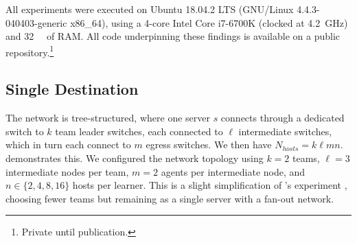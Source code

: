 \documentclass[10pt, times, comsoc]{IEEEtran}
\newcommand{\wvec}[1]{\ensuremath{\bm{w}_{#1}}}
\begin{document}
All experiments were executed on Ubuntu 18.04.2 LTS (GNU/Linux 4.4.3-040403-generic x86\_64), using a 4-core Intel Core i7-6700K (clocked at \SI{4.2}{\giga\hertz}) and \SI{32}{\gibi\byte} of RAM.
All code underpinning these findings is available on a public repository.\footnote{Private until publication.}

\subsection{Single Destination}\label{sec:single-dest}
The network is tree-structured, where one server $s$ connects through a dedicated switch to $k$ team leader switches, each connected to $\ell$ intermediate switches, which in turn each connect to $m$ egress switches.
We then have $N_{\mathit{hosts}} = k \ell m n$.
 demonstrates this.
We configured the network topology using $k=2$ teams, $\ell=3$ intermediate nodes per team, $m=2$ agents per intermediate node, and $n \in \{2, 4, 8, 16\}$ hosts per learner.
This is a slight simplification of \citeauthor{DBLP:journals/eaai/MalialisK15}'s  experiment \cite{DBLP:journals/eaai/MalialisK15}, choosing fewer teams but remaining as a single server with a fan-out network.
\end{document}
